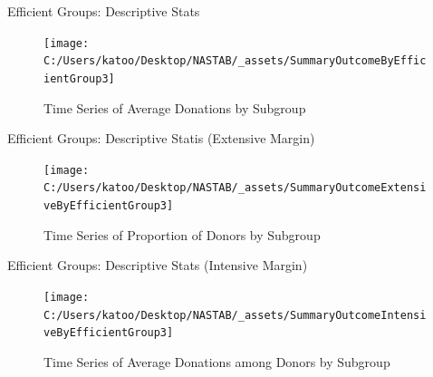 \documentclass[
  ignorenonframetext,
]{beamer}
\begin{document}
\begin{frame}{Efficient Groups: Descriptive Stats}
\protect\hypertarget{efficient-groups-descriptive-stats}{}
\begin{figure}
\texttt{[image: C:/Users/katoo/Desktop/NASTAB/\_assets/SummaryOutcomeByEfficientGroup3]} \caption{Time Series of Average Donations by Subgroup}\label{fig:unnamed-chunk-11}
\end{figure}
\end{frame}

\begin{frame}{Efficient Groups: Descriptive Statis (Extensive Margin)}
\protect\hypertarget{efficient-groups-descriptive-statis-extensive-margin}{}
\begin{figure}
\texttt{[image: C:/Users/katoo/Desktop/NASTAB/\_assets/SummaryOutcomeExtensiveByEfficientGroup3]} \caption{Time Series of Proportion of Donors by Subgroup}\label{fig:unnamed-chunk-12}
\end{figure}
\end{frame}

\begin{frame}{Efficient Groups: Descriptive Stats (Intensive Margin)}
\protect\hypertarget{efficient-groups-descriptive-stats-intensive-margin}{}
\begin{figure}
\texttt{[image: C:/Users/katoo/Desktop/NASTAB/\_assets/SummaryOutcomeIntensiveByEfficientGroup3]} \caption{Time Series of Average Donations among Donors by Subgroup}\label{fig:unnamed-chunk-13}
\end{figure}
\end{frame}
\end{document}
